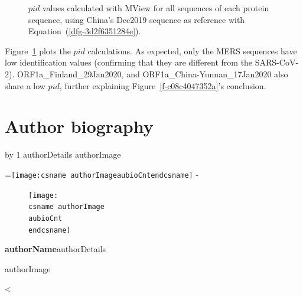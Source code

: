 \documentclass[11pt]{article}
\makeatletter
\newcounter{aubio}
\newcommand{\checkheight}[1]{%
  \par \penalty-100\begingroup%
  \setbox8=\hbox{#1}%
  \setlength{\dimen@}{\ht8}%
  \dimen@ii\pagegoal \advance\dimen@ii-\pagetotal
  \ifdim \dimen@>\dimen@ii
    \break
  \fi\endgroup}
\def\printBio{%
  \@tempcnta=0
   \loop
     \advance \@tempcnta by 1
     \def\aubioCnt{\the\@tempcnta}
     \setlength{\intextsep}{0pt}%
     \setlength{\columnsep}{10pt}%
     \newbox\boxa%
     \setbox\boxa\vbox{\csname authorDetails\aubioCnt\endcsname}
     \expandafter\ifx\csname authorImage\aubioCnt\endcsname\relax%
      \else%
       \checkheight{\texttt{[image: \\csname authorImage\\aubioCnt\\endcsname]}}
        \begin{figure}
         \texttt{[image: \\csname authorImage\\aubioCnt\\endcsname]}%
        \end{figure}\par
      \fi
     {\parindent0pt\textbf{\csname authorName\aubioCnt\endcsname}\csname authorDetails\aubioCnt\endcsname \par\bigskip%
     \expandafter\ifx\csname authorImage\aubioCnt\endcsname\relax\else%
      \ifdim\the\ht\boxa < 90pt\vskip\dimexpr(90pt -\the\ht\boxa-1pc)\fi%
     \fi}%
      \ifnum\@tempcnta < \theaubio
   \repeat
   }
\def\fixFloatSize#1{}%
\makeatother
\begin{document}
\bgroup
\fixFloatSize{images/90f1d9b1-53d0-4b96-bd86-e4490c95bb44-uplt_protein_vs_pid.png}
\begin{figure}[!htbp]
\centering \makeatletter{}
\makeatother 
\caption{{$pid $ values calculated with MView for all sequences of each protein sequence, using China's Dec2019 sequence as reference with Equation~(\ref{dfg-3d2f6351284e}).}}
\label{f-216a5e4c828e}
\end{figure}
\egroup
Figure~\ref{f-216a5e4c828e} plots the $pid $ calculations. As expected, only the MERS sequences have low identification values (confirming that they are different from the SARS-CoV-2). ORF1a\_Finland\_29Jan2020, and ORF1a\_China-Yunnan\_17Jan2020 also share a low $pid $, further explaining Figure~\ref{f-c08c4047352a}'s conclusion.

\clearpage 
    





\section*{Author biography}

\printBio 
\end{document}
